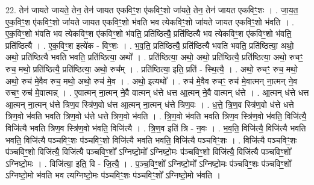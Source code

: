 \documentclass[17pt]{extarticle}
\begin{document}
22. तेन॑ जायते जायते॒ तेन॒ तेन॑ जायत एकविꣳ॒॒श ए॑कविꣳ॒॒शो जा॑यते॒ तेन॒ तेन॑ जायत एकविꣳ॒॒शः । . जा॒य॒त॒ ए॒क॒विꣳ॒॒श ए॑कविꣳ॒॒शो जा॑यते जायत एकविꣳ॒॒शो भ॑वति भव त्येकविꣳ॒॒शो जा॑यते जायत एकविꣳ॒॒शो भ॑वति । . ए॒क॒विꣳ॒॒शो भ॑वति भव त्येकविꣳ॒॒श ए॑कविꣳ॒॒शो भ॑वति॒ प्रति॑ष्ठित्यै॒ प्रति॑ष्ठित्यै भव त्येकविꣳ॒॒श ए॑कविꣳ॒॒शो भ॑वति॒ प्रति॑ष्ठित्यै । . ए॒क॒विꣳ॒॒श इत्ये॑क - विꣳ॒॒शः । . भ॒व॒ति॒ प्रति॑ष्ठित्यै॒ प्रति॑ष्ठित्यै भवति भवति॒ प्रति॑ष्ठित्या॒ अथो॒ अथो॒ प्रति॑ष्ठित्यै भवति भवति॒ प्रति॑ष्ठित्या॒ अथो᳚ । . प्रति॑ष्ठित्या॒ अथो॒ अथो॒ प्रति॑ष्ठित्यै॒ प्रति॑ष्ठित्या॒ अथो॒ रुचꣳ॒॒ रुच॒ मथो॒ प्रति॑ष्ठित्यै॒ प्रति॑ष्ठित्या॒ अथो॒ रुच᳚म् । . प्रति॑ष्ठित्या॒ इति॒ प्रति॑ - स्थि॒त्यै॒ । . अथो॒ रुचꣳ॒॒ रुच॒ मथो॒ अथो॒ रुच॑ मे॒वैव रुच॒ मथो॒ अथो॒ रुच॑ मे॒व । . अथो॒ इत्यथो᳚ । . रुच॑ मे॒वैव रुचꣳ॒॒ रुच॑ मे॒वात्मन् ना॒त्मन् ने॒व रुचꣳ॒॒ रुच॑ मे॒वात्मन्न् । . ए॒वात्मन् ना॒त्मन् ने॒वै वात्मन् ध॑त्ते धत्त आ॒त्मन् ने॒वै वात्मन् ध॑त्ते । . आ॒त्मन् ध॑त्ते धत्त आ॒त्मन् ना॒त्मन् ध॑त्ते त्रिण॒व स्त्रि॑ण॒वो ध॑त्त आ॒त्मन् ना॒त्मन् ध॑त्ते त्रिण॒वः । . ध॒त्ते॒ त्रि॒ण॒व स्त्रि॑ण॒वो ध॑त्ते धत्ते त्रिण॒वो भ॑वति भवति त्रिण॒वो ध॑त्ते धत्ते त्रिण॒वो भ॑वति । . त्रि॒ण॒वो भ॑वति भवति त्रिण॒व स्त्रि॑ण॒वो भ॑वति॒ विजि॑त्यै॒ विजि॑त्यै भवति त्रिण॒व स्त्रि॑ण॒वो भ॑वति॒ विजि॑त्यै । . त्रि॒ण॒व इति॑ त्रि - न॒वः । . भ॒व॒ति॒ विजि॑त्यै॒ विजि॑त्यै भवति भवति॒ विजि॑त्यै पञ्चविꣳ॒॒शः प॑ञ्चविꣳ॒॒शो विजि॑त्यै भवति भवति॒ विजि॑त्यै पञ्चविꣳ॒॒शः । . विजि॑त्यै पञ्चविꣳ॒॒शः प॑ञ्चविꣳ॒॒शो विजि॑त्यै॒ विजि॑त्यै पञ्चविꣳ॒॒शो᳚ ऽग्निष्टो॒मो᳚ ऽग्निष्टो॒मः प॑ञ्चविꣳ॒॒शो विजि॑त्यै॒ विजि॑त्यै पञ्चविꣳ॒॒शो᳚ ऽग्निष्टो॒मः । . विजि॑त्या॒ इति॒ वि - जि॒त्यै॒ । . प॒ञ्च॒विꣳ॒॒शो᳚ ऽग्निष्टो॒मो᳚ ऽग्निष्टो॒मः प॑ञ्चविꣳ॒॒शः प॑ञ्चविꣳ॒॒शो᳚ ऽग्निष्टो॒मो भ॑वति भव त्यग्निष्टो॒मः प॑ञ्चविꣳ॒॒शः प॑ञ्चविꣳ॒॒शो᳚ ऽग्निष्टो॒मो भ॑वति । \newline
\end{document}
